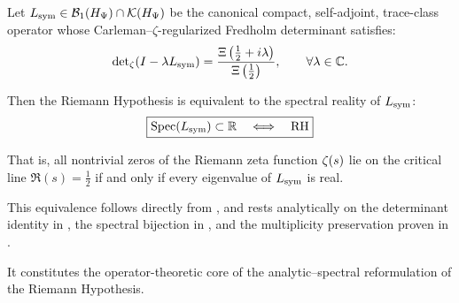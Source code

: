 \begin{corollary}
\label{cor:spectrum_real_equiv_rh}

Let \( L_{\mathrm{sym}} \in \mathcal{B}_1(H_{\Psi}) \cap \mathcal{K}(H_{\Psi}) \) be the canonical compact, self-adjoint, trace-class operator whose Carleman–\(\zeta\)-regularized Fredholm determinant satisfies:
\[
\det\nolimits_\zeta(I - \lambda L_{\mathrm{sym}})
= \frac{\Xi\left(\tfrac{1}{2} + i\lambda\right)}{\Xi\left(\tfrac{1}{2}\right)},
\qquad \forall \lambda \in \mathbb{C}.
\]

Then the Riemann Hypothesis is equivalent to the spectral reality of \( L_{\mathrm{sym}} \):
\[
\boxed{
\operatorname{Spec}(L_{\mathrm{sym}}) \subset \mathbb{R}
\quad \Longleftrightarrow \quad \mathrm{RH}
}
\]

\noindent
That is, all nontrivial zeros of the Riemann zeta function \( \zeta(s) \) lie on the critical line \( \Re(s) = \tfrac{1}{2} \) if and only if every eigenvalue of \( L_{\mathrm{sym}} \) is real.

\medskip

\noindent
This equivalence follows directly from , and rests analytically on the determinant identity in , the spectral bijection in , and the multiplicity preservation proven in .

\medskip

It constitutes the operator-theoretic core of the analytic–spectral reformulation of the Riemann Hypothesis.
\end{corollary}
